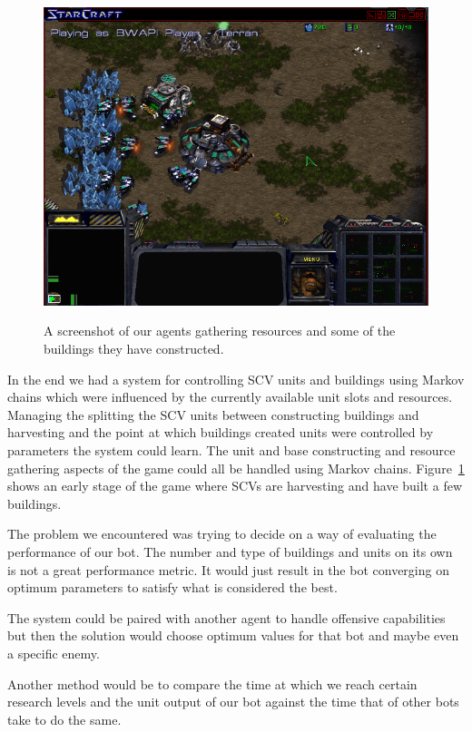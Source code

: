 
\begin{figure}[ht]
\centering
\includegraphics[scale=0.6, trim = 0cm 0cm 0cm 0.0cm]{images/Victory}
\label{fig:gameplay}
\caption{A screenshot of our agents gathering resources and some of the buildings they have constructed.}
\end{figure}


In the end we had a system for controlling SCV units and buildings using Markov chains which were influenced by the currently available unit slots and resources. Managing the splitting the SCV units between constructing buildings and harvesting and the point at which buildings created units were controlled by parameters the system could learn. The unit and base constructing and resource gathering aspects of the game could all be handled using Markov chains. Figure~\ref{fig:gameplay} shows an early stage of the game where SCVs are harvesting and have built a few buildings.


 The problem we encountered was trying to decide on a way of evaluating the performance of our bot. The number and type of buildings and units on its own is not a great performance metric. It would just result in the bot converging on optimum parameters to satisfy what is considered the best.

 The system could be paired with another agent to handle offensive capabilities but then the solution would choose optimum values for that bot and maybe even a specific enemy.

 Another method would be to compare the time at which we reach certain research levels and the unit output of our bot against the time that of other bots take to do the same.